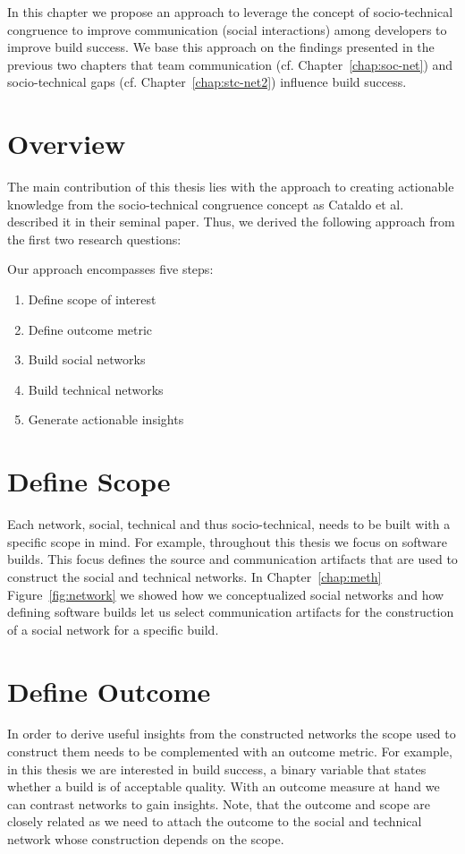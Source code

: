 \label{chap:approach}
In this chapter we propose an approach to leverage the concept of socio-technical congruence to improve communication (social interactions) among developers to improve build success.
We base this approach on the findings presented in the previous two chapters that team communication (cf. Chapter~\ref{chap:soc-net}) and socio-technical gaps (cf. Chapter~\ref{chap:stc-net2})  influence build success.

\section{Overview}
The main contribution of this thesis lies with the approach to creating actionable knowledge from the socio-technical congruence concept as Cataldo et al.~\cite{cataldo:cscw:2006} described it in their seminal paper.
Thus, we derived the following approach from the first two research questions:

Our approach encompasses five steps:
\begin{enumerate}
\item Define scope of interest
\item Define outcome metric
\item Build social networks
\item Build technical networks
\item Generate actionable insights
\end{enumerate}

\section{Define Scope} 
Each network, social, technical and thus socio-technical, needs to be built with a specific scope in mind.
For example, throughout this thesis we focus on software builds.
This focus defines the source and communication artifacts that are used to construct the social and technical networks.
In Chapter~\ref{chap:meth} Figure~\ref{fig:network} we showed how we conceptualized social networks and how defining software builds let us select communication artifacts for the construction of a social network for a specific build.

\section{Define Outcome}
In order to derive useful insights from the constructed networks the scope used to construct them needs to be complemented with an outcome metric.
For example, in this thesis we are interested in build success, a binary variable that states whether a build is of acceptable quality.
With an outcome measure at hand we can contrast networks to gain insights.
Note, that the outcome and scope are closely related as we need to attach the outcome to the social and technical network whose construction depends on the scope.

